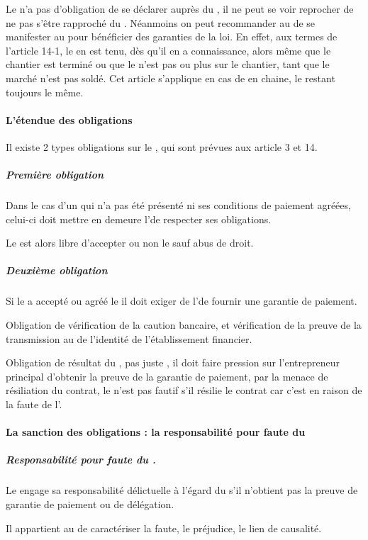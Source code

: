 				Le \ST n’a pas d’obligation de se déclarer auprès du \MO, il ne peut se voir reprocher de ne pas s’être rapproché du \MO. Néanmoins on peut recommander au \ST de se manifester au \MO pour bénéficier des garanties de la loi.
En effet,  aux termes de l'article 14-1, le \MO en est tenu, dès qu’il en a connaissance, alors même que le chantier est terminé ou que le \ST n’est pas ou plus sur le chantier, tant que le marché n’est pas soldé. Cet article s'applique en cas de \ST* en chaine, le \MO restant toujours le même.


			\paragraph{L'étendue des obligations}

				Il existe 2 types obligations sur le \MO, qui sont prévues aux
article 3 et 14.

				\subparagraph{Première obligation}
				Dans le cas d'un \ST qui n’a pas été présenté ni ses conditions de paiement agréées, celui-ci doit mettre en demeure l’\ep de respecter ses obligations.

				Le \MO est alors libre d’accepter ou non le \ST sauf abus de droit.

				\subparagraph{Deuxième obligation}

				Si le \MO a accepté ou agréé le \ST il doit exiger de l’\ep de fournir une garantie de paiement.

				Obligation de vérification de la caution bancaire, et vérification de la preuve de la transmission au \ST de l’identité de l’établissement financier.

				Obligation de résultat du \MO, pas juste \MED, il doit faire pression sur l’entrepreneur principal d’obtenir la preuve de la garantie de paiement, par la menace de résiliation du contrat, le \MO n’est pas fautif s’il résilie le contrat car c’est en raison de la faute de l’\ep.

			\paragraph{La sanction des obligations : la responsabilité pour faute du \Mo}

				\subparagraph{Responsabilité pour faute du \MO.} Le \MO engage sa responsabilité délictuelle à l’égard du \ST s’il n’obtient pas la preuve de garantie de paiement ou de délégation.

				Il appartient au \ST de caractériser la faute, le préjudice, le lien de causalité.

